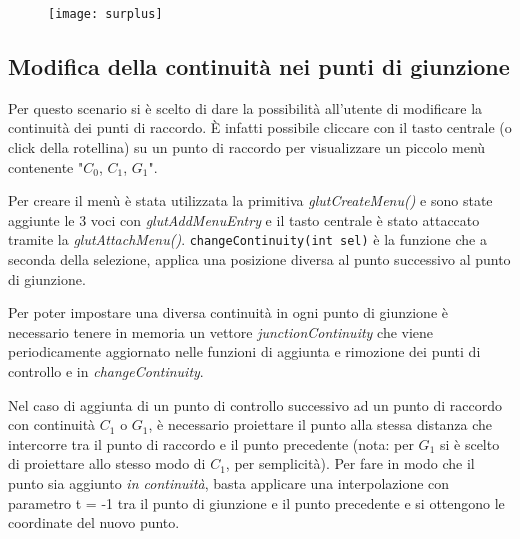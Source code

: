  \begin{figure}[htb]
    \centering
    \texttt{[image: surplus]}
    \caption{\label{fig:surplus}}
    \vspace{-0.3cm}
\end{figure}


\subsection{Modifica della continuità nei punti di giunzione}
Per questo scenario si è scelto di dare la possibilità all'utente di modificare la continuità dei punti di raccordo. È infatti possibile cliccare con il tasto centrale (o click della rotellina) su un punto di raccordo per visualizzare un piccolo menù contenente "$C_0$, $C_1$, $G_1$".

Per creare il menù è stata utilizzata la primitiva \textit{glutCreateMenu()} e sono state aggiunte le 3 voci con \textit{glutAddMenuEntry} e il tasto centrale è stato attaccato tramite la \textit{glutAttachMenu()}. \texttt{changeContinuity(int sel)} è la funzione che a seconda della selezione, applica una posizione diversa al punto successivo al punto di giunzione.

Per poter impostare una diversa continuità in ogni punto di giunzione è necessario tenere in memoria un vettore \textit{junctionContinuity} che viene periodicamente aggiornato nelle funzioni di aggiunta e rimozione dei punti di controllo e in \textit{changeContinuity}.

Nel caso di aggiunta di un punto di controllo successivo ad un punto di raccordo con continuità $C_1$ o $G_1$, è necessario proiettare il punto alla stessa distanza che intercorre tra il punto di raccordo e il punto precedente (nota: per $G_1$ si è scelto di proiettare allo stesso modo di $C_1$, per semplicità). Per fare in modo che il punto sia aggiunto \textit{in continuità}, basta applicare una interpolazione con parametro t = -1 tra il punto di giunzione e il punto precedente e si ottengono le coordinate del nuovo punto.


